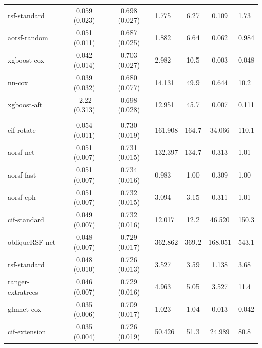 \documentclass[twoside,11pt]{article}\usepackage[]{graphicx}\usepackage[]{xcolor}
\newenvironment{knitrout}{}{} %
\begin{document}
\begin{knitrout}
\begin{longtable}{lcclccl}
\hspace{1em}rsf-standard & 0.059 (0.023) & 0.698 (0.027) & 1.775 & 6.27 & 0.109 & 1.73\\
\hspace{1em}aorsf-random & 0.051 (0.011) & 0.687 (0.025) & 1.882 & 6.64 & 0.062 & 0.984\\
\hspace{1em}xgboost-cox & 0.042 (0.014) & 0.703 (0.027) & 2.982 & 10.5 & 0.003 & 0.048\\
\hspace{1em}nn-cox & 0.039 (0.032) & 0.680 (0.077) & 14.131 & 49.9 & 0.644 & 10.2\\
\hspace{1em}xgboost-aft & -2.22 (0.313) & 0.698 (0.028) & 12.951 & 45.7 & 0.007 & 0.111\\
\addlinespace[0.3em]
\hline
\multicolumn{7}{l}{\textit{\textbf{Heart Transplant; graft-loss or death, n = 3787, p = 52}}}\\
\hline
\hspace{1em}cif-rotate & 0.054 (0.011) & 0.730 (0.019) & 161.908 & 164.7 & 34.066 & 110.1\\
\hspace{1em}aorsf-net & 0.051 (0.007) & 0.731 (0.015) & 132.397 & 134.7 & 0.313 & 1.01\\
\hspace{1em}aorsf-fast & 0.051 (0.007) & 0.734 (0.016) & 0.983 & 1.00 & 0.309 & 1.00\\
\hspace{1em}aorsf-cph & 0.051 (0.007) & 0.732 (0.015) & 3.094 & 3.15 & 0.311 & 1.01\\
\hspace{1em}cif-standard & 0.049 (0.007) & 0.732 (0.016) & 12.017 & 12.2 & 46.520 & 150.3\\
\hspace{1em}obliqueRSF-net & 0.048 (0.007) & 0.729 (0.017) & 362.862 & 369.2 & 168.051 & 543.1\\
\hspace{1em}rsf-standard & 0.048 (0.010) & 0.726 (0.013) & 3.527 & 3.59 & 1.138 & 3.68\\
\hspace{1em}ranger-extratrees & 0.046 (0.007) & 0.729 (0.016) & 4.963 & 5.05 & 3.527 & 11.4\\
\hspace{1em}glmnet-cox & 0.035 (0.006) & 0.709 (0.017) & 1.023 & 1.04 & 0.013 & 0.042\\
\hspace{1em}cif-extension & 0.035 (0.004) & 0.726 (0.019) & 50.426 & 51.3 & 24.989 & 80.8\\

\end{longtable}
\end{knitrout}
\end{document}
